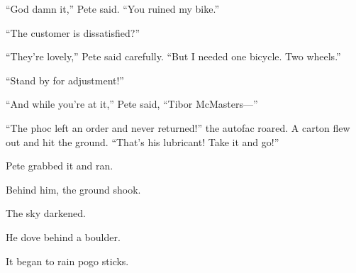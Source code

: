 “God damn it,” Pete said. “You ruined my bike.”

“The customer is dissatisfied?”

“They’re lovely,” Pete said carefully. “But I needed one bicycle. Two wheels.”

“Stand by for adjustment!”

“And while you’re at it,” Pete said, “Tibor McMasters—”

“The phoc left an order and never returned!” the autofac roared. A carton flew out and hit the ground. “That’s his lubricant! Take it and go!”

Pete grabbed it and ran.

Behind him, the ground shook.

The sky darkened.

He dove behind a boulder.

It began to rain pogo sticks.

